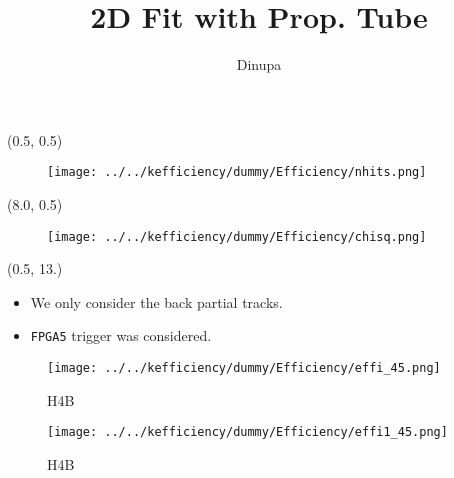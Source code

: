 \documentclass[10pt, xcolor={dvipsnames}, aspectratio = 169]{beamer}
\title{2D Fit with Prop. Tube}
\author{Dinupa}
\begin{document}
\begin{frame}
\maketitle
\end{frame}


\begin{frame}[fragile]

\begin{textblock}{7.0}(0.5, 0.5)
\begin{figure}
\centering
\texttt{[image: ../../kefficiency/dummy/Efficiency/nhits.png]}
\end{figure}
\end{textblock}

\begin{textblock}{7.0}(8.0, 0.5)
\begin{figure}
\centering
\texttt{[image: ../../kefficiency/dummy/Efficiency/chisq.png]}
\end{figure}
\end{textblock}

\begin{textblock}{10.0}(0.5, 13.)
\begin{itemize}

	\item We only consider the back partial tracks.
	\item \verb|FPGA5| trigger was considered.
\end{itemize}
\end{textblock}

\end{frame}


\begin{frame}

\begin{figure}
\centering
\texttt{[image: ../../kefficiency/dummy/Efficiency/effi\_45.png]}
\caption{H4B}
\end{figure}

\end{frame}


\begin{frame}

\begin{figure}
\centering
\texttt{[image: ../../kefficiency/dummy/Efficiency/effi1\_45.png]}
\caption{H4B}
\end{figure}

\end{frame}
\end{document}

